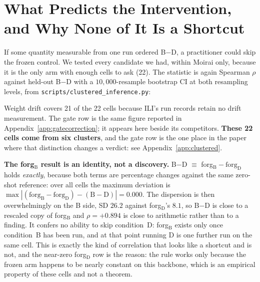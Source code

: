 \section{What Predicts the Intervention, and Why None of It Is a Shortcut}
\label{app:predictor}

If some quantity measurable from one run ordered B$-$D, a practitioner could
skip the frozen control. We tested every candidate we had, within Moirai only,
because it is the only arm with enough cells to ask (22). The statistic is again
Spearman $\rho$ against held-out B$-$D with a $10{,}000$-resample bootstrap CI at
both resampling levels, from \texttt{scripts/clustered\_inference.py}:



\noindent Weight drift covers 21 of the 22 cells because ILI's run records
retain no drift measurement. The gate row is the same figure reported in
Appendix~\ref{app:gatecorrection}; it appears here beside its competitors. \textbf{These 22 cells come from six
clusters}, and the gate row is the one place in the paper where that distinction
changes a verdict: see Appendix~\ref{app:clustered}.

\textbf{The forg$_\text{B}$ result is an identity, not a discovery.} B$-$D
$\equiv$ forg$_\text{B} - \text{forg}_\text{D}$ holds \emph{exactly}, because
both terms are percentage changes against the same zero-shot reference: over all
cells the maximum deviation is
$\max|(\text{forg}_\text{B}-\text{forg}_\text{D})-(\text{B}{-}\text{D})|
= 0.000$. The dispersion is then overwhelmingly on the B side, SD $26.2$ against
forg$_\text{D}$'s $8.1$, so B$-$D is close to a rescaled copy of
forg$_\text{B}$ and $\rho{=}{+}0.894$ is close to arithmetic rather than to a
finding. It confers no ability to skip condition~D: forg$_\text{B}$ exists only
once condition~B has been run, and at that point running D is one further run on
the same cell. This is exactly the kind of correlation that looks like a
shortcut and is not, and the near-zero forg$_\text{D}$ row is the reason: the
rule works only because the frozen arm happens to be nearly constant on this
backbone, which is an empirical property of these cells and not a theorem.

